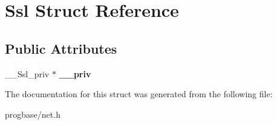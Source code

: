 \hypertarget{struct_ssl}{}\section{Ssl Struct Reference}
\label{struct_ssl}
\subsection*{Public Attributes}
\begin{DoxyCompactItemize}
\item 
\mbox{\label{struct_ssl_a76ccd7ac6505c15497b459a9e80d03bb}} 
\+\_\+\+\_\+\+Ssl\+\_\+priv $\ast$ {\bfseries \+\_\+\+\_\+priv}
\end{DoxyCompactItemize}


The documentation for this struct was generated from the following file\+:\begin{DoxyCompactItemize}
\item 
progbase/net.\+h\end{DoxyCompactItemize}
